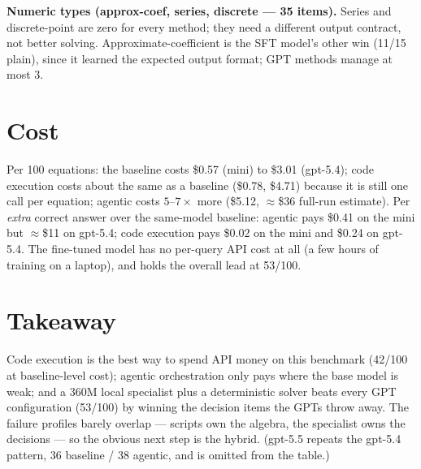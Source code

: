 \documentclass[11pt]{article}
\begin{document}
\textbf{Numeric types (approx-coef, series, discrete --- 35 items).}
Series and discrete-point are zero for every method; they need a different
output contract, not better solving. Approximate-coefficient is the SFT
model's other win (11/15 plain), since it learned the expected output format;
GPT methods manage at most 3.

\section{Cost}

Per 100 equations: the baseline costs \$0.57 (mini) to \$3.01 (gpt-5.4);
code execution costs about the same as a baseline (\$0.78, \$4.71) because it
is still one call per equation; agentic costs $5$--$7\times$ more (\$5.12,
$\approx$\$36 full-run estimate). Per \emph{extra} correct answer over the
same-model baseline: agentic pays \$0.41 on the mini but $\approx$\$11 on
gpt-5.4; code execution pays \$0.02 on the mini and \$0.24 on gpt-5.4. The
fine-tuned model has no per-query API cost at all (a few hours of training on
a laptop), and holds the overall lead at 53/100.

\section{Takeaway}

Code execution is the best way to spend API money on this benchmark (42/100
at baseline-level cost); agentic orchestration only pays where the base model
is weak; and a 360M local specialist plus a deterministic solver beats every
GPT configuration (53/100) by winning the decision items the GPTs throw away.
The failure profiles barely overlap --- scripts own the algebra, the
specialist owns the decisions --- so the obvious next step is the hybrid.
(gpt-5.5 repeats the gpt-5.4 pattern, 36 baseline / 38 agentic, and is
omitted from the table.)
\end{document}
